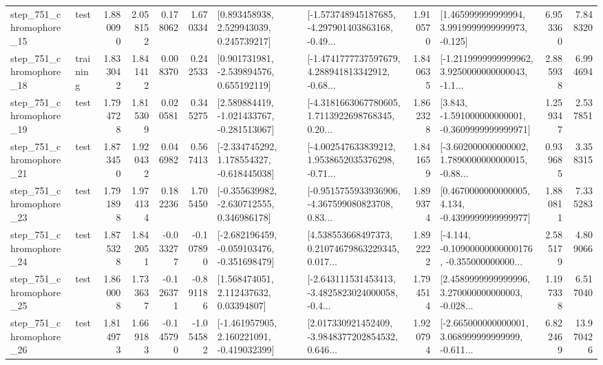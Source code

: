 \begin{tabular}{llrrrrllrlrr}
  step\_751\_chromophore\_15 &      test &      1.880090 &    2.058152 &      0.178062 &  1.670334 &     [0.893458938, 2.529943039, 0.245739217] &  [-1.573748945187685, -4.297901403863168, -0.49... &       1.910570 &    [1.465999999999994, 3.9919999999999973, -0.125] &            6.953360 &          7.848320 \\
  step\_751\_chromophore\_18 &  training &      1.833042 &    1.841412 &      0.008370 &  0.242533 &    [0.901731981, -2.539894576, 0.655192119] &  [-1.4741777737597679, 4.288941813342912, -0.68... &       1.840635 &  [-1.2119999999999962, 3.9250000000000043, -1.1... &            2.885938 &          6.994694 \\
  step\_751\_chromophore\_19 &      test &      1.794728 &    1.815309 &      0.020581 &  0.345275 &   [2.589884419, -1.021433767, -0.281513067] &  [-4.3181663067780605, 1.7113922698768345, 0.20... &       1.862328 &   [3.843, -1.591000000000001, -0.3609999999999971] &            1.259347 &          2.537851 \\
  step\_751\_chromophore\_21 &      test &      1.873450 &    1.920432 &      0.046982 &  0.567413 &   [-2.334745292, 1.178554327, -0.618445038] &  [-4.002547633839212, 1.9538652035376298, -0.71... &       1.841659 &  [-3.602000000000002, 1.7890000000000015, -0.88... &            0.939685 &          3.358315 \\
  step\_751\_chromophore\_23 &      test &      1.791898 &    1.974134 &      0.182236 &  1.705450 &   [-0.355639982, -2.630712555, 0.346986178] &  [-0.9515755933936906, -4.367599080823708, 0.83... &       1.899374 &   [0.4670000000000005, 4.134, -0.4399999999999977] &            1.880811 &          7.335283 \\
  step\_751\_chromophore\_24 &      test &      1.875328 &    1.842051 &     -0.033277 & -0.107890 &  [-2.682196459, -0.059103476, -0.351698479] &  [4.538553668497373, 0.21074679863229345, 0.017... &       1.892222 &  [-4.144, -0.10900000000000176, -0.355000000000... &            2.585179 &          4.809066 \\
  step\_751\_chromophore\_25 &      test &      1.860008 &    1.733637 &     -0.126371 & -0.891186 &      [1.568474051, 2.112437632, 0.03394807] &  [-2.643111531453413, -3.4825823024000058, -0.4... &       1.794514 &  [2.4589999999999996, 3.270000000000003, -0.028... &            1.197338 &          6.517040 \\
  step\_751\_chromophore\_26 &      test &      1.814973 &    1.669183 &     -0.145790 & -1.054582 &   [-1.461957905, 2.160221091, -0.419032399] &  [2.017330921452409, -3.9848377202854532, 0.646... &       1.920794 &  [-2.665000000000001, 3.068999999999999, -0.611... &            6.822469 &         13.970426 \\

\end{tabular}
